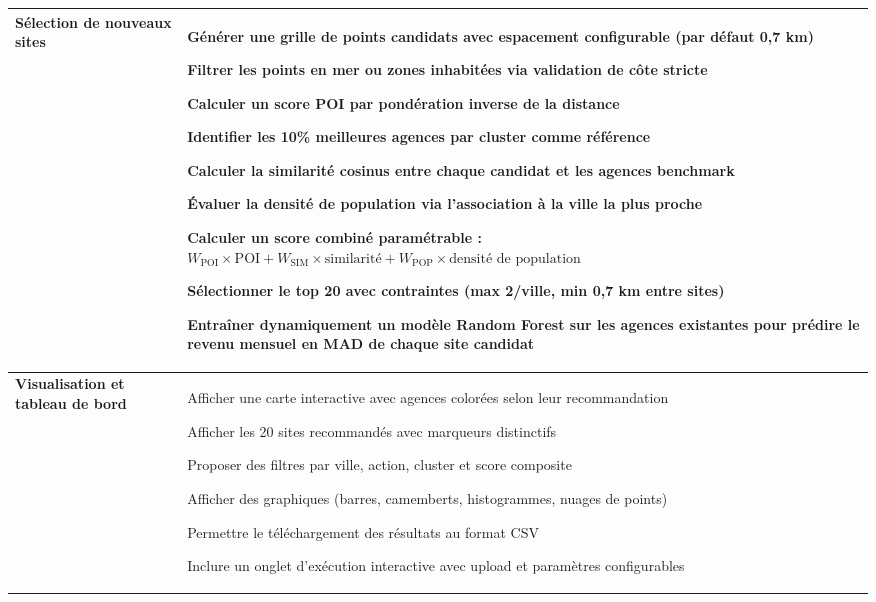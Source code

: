 \documentclass[11pt,a4paper,twoside]{report}
\begin{document}
\begin{longtable}{|p{3.5cm}|p{10.5cm}|}
\textbf{Sélection de nouveaux sites} &
\begin{tblitem}
    \item Générer une grille de points candidats avec espacement configurable (par défaut 0,7 km)
    \item Filtrer les points en mer ou zones inhabitées via validation de côte stricte
    \item Calculer un score POI par pondération inverse de la distance
    \item Identifier les 10\% meilleures agences par cluster comme référence
    \item Calculer la similarité cosinus entre chaque candidat et les agences benchmark
    \item Évaluer la densité de population via l'association à la ville la plus proche
    \item Calculer un score combiné paramétrable : $W_{\text{POI}} \times \text{POI} + W_{\text{SIM}} \times \text{similarité} + W_{\text{POP}} \times \text{densité de population}$
    \item Sélectionner le top 20 avec contraintes (max 2/ville, min 0,7 km entre sites)
    \item Entraîner dynamiquement un modèle Random Forest sur les agences existantes pour prédire le revenu mensuel en MAD de chaque site candidat
\end{tblitem} \\
\hline

\textbf{Visualisation et tableau de bord} &
\begin{tblitem}
    \item Afficher une carte interactive avec agences colorées selon leur recommandation
    \item Afficher les 20 sites recommandés avec marqueurs distinctifs
    \item Proposer des filtres par ville, action, cluster et score composite
    \item Afficher des graphiques (barres, camemberts, histogrammes, nuages de points)
    \item Permettre le téléchargement des résultats au format CSV
    \item Inclure un onglet d'exécution interactive avec upload et paramètres configurables
\end{tblitem} \\
\hline


\end{longtable}
\end{document}

